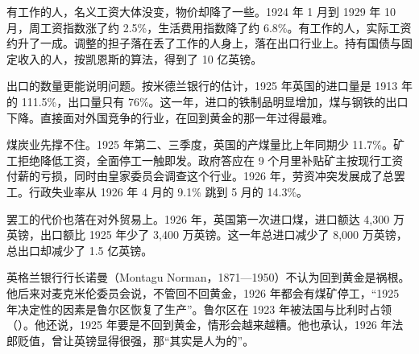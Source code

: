 
有工作的人，名义工资大体没变，物价却降了一些。1924 年 1 月到 1929 年 10 月，周工资指数涨了约 2.5\%，生活费用指数降了约 6.8\%\cite{boe2017}。有工作的人，实际工资约升了一成。调整的担子落在丢了工作的人身上，落在出口行业上。持有国债与固定收入的人，按凯恩斯的算法，得到了 10 亿英镑\cite{keynes1925}。

出口的数量更能说明问题。按米德兰银行的估计，1925 年英国的进口量是 1913 年的 111.5\%，出口量只有 76\%\cite{brown1940}。这一年，进口的铁制品明显增加，煤与钢铁的出口下降。直接面对外国竞争的行业，在回到黄金的那一年过得最难\cite{brown1940}。

煤炭业先撑不住。1925 年第二、三季度，英国的产煤量比上年同期少 11.7\%\cite{macmillan1931}。矿工拒绝降低工资，全面停工一触即发。政府答应在 9 个月里补贴矿主按现行工资付薪的亏损，同时由皇家委员会调查这个行业\cite{macmillan1931}。1926 年，劳资冲突发展成了总罢工\cite{macmillan1931,brown1940}。行政失业率从 1926 年 4 月的 9.1\% 跳到 5 月的 14.3\%\cite{boe2017}。

罢工的代价也落在对外贸易上。1926 年，英国第一次进口煤，进口额达 4,300 万英镑，出口额比 1925 年少了 3,400 万英镑\cite{brown1940}。这一年总进口减少了 8,000 万英镑，总出口却减少了 1.5 亿英镑\cite{brown1940}。


英格兰银行行长诺曼（Montagu Norman，1871—1950）不认为回到黄金是祸根\cite{brown1940,hansardpeople27}。他后来对麦克米伦委员会说，不管回不回黄金，1926 年都会有煤矿停工，“1925 年决定性的因素是鲁尔区恢复了生产”\cite{brown1940}。鲁尔区在 1923 年被法国与比利时占领（）。他还说，1925 年要是不回到黄金，情形会越来越糟\cite{brown1940}。他也承认，1926 年法郎贬值，曾让英镑显得很强，那“其实是人为的”\cite{brown1940}。

